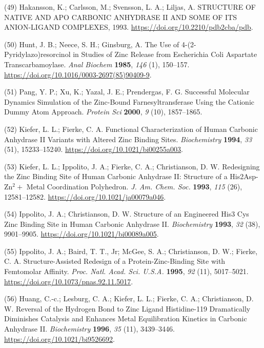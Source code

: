 \documentclass[ lineno,
  9pt]{elife}
\newenvironment{cslreferences}%
  {}%
  {\par}
\begin{document}
\begin{cslreferences}
\leavevmode\hypertarget{ref-jyFnBdWm}{}%
(49) Hakansson, K.; Carlsson, M.; Svensson, L. A.; Liljas, A. STRUCTURE OF NATIVE AND APO CARBONIC ANHYDRASE II AND SOME OF ITS ANION-LIGAND COMPLEXES, 1993. \url{https://doi.org/10.2210/pdb2cba/pdb}.

\leavevmode\hypertarget{ref-13XuOF3Jj}{}%
(50) Hunt, J. B.; Neece, S. H.; Ginsburg, A. The Use of 4-(2-Pyridylazo)resorcinol in Studies of Zinc Release from Escherichia Coli Aspartate Transcarbamoylase. \emph{Anal Biochem} \textbf{1985}, \emph{146} (1), 150--157. \url{https://doi.org/10.1016/0003-2697(85)90409-9}.

\leavevmode\hypertarget{ref-pchdLF0k}{}%
(51) Pang, Y. P.; Xu, K.; Yazal, J. E.; Prendergas, F. G. Successful Molecular Dynamics Simulation of the Zinc-Bound Farnesyltransferase Using the Cationic Dummy Atom Approach. \emph{Protein Sci} \textbf{2000}, \emph{9} (10), 1857--1865.

\leavevmode\hypertarget{ref-D3VQQdjb}{}%
(52) Kiefer, L. L.; Fierke, C. A. Functional Characterization of Human Carbonic Anhydrase II Variants with Altered Zinc Binding Sites. \emph{Biochemistry} \textbf{1994}, \emph{33} (51), 15233--15240. \url{https://doi.org/10.1021/bi00255a003}.

\leavevmode\hypertarget{ref-w3tzhp92}{}%
(53) Kiefer, L. L.; Ippolito, J. A.; Fierke, C. A.; Christianson, D. W. Redesigning the Zinc Binding Site of Human Carbonic Anhydrase II: Structure of a His2Asp-Zn$^2+$ Metal Coordination Polyhedron. \emph{J. Am. Chem. Soc.} \textbf{1993}, \emph{115} (26), 12581--12582. \url{https://doi.org/10.1021/ja00079a046}.

\leavevmode\hypertarget{ref-iu33cNMg}{}%
(54) Ippolito, J. A.; Christianson, D. W. Structure of an Engineered His3 Cys Zinc Binding Site in Human Carbonic Anhydrase II. \emph{Biochemistry} \textbf{1993}, \emph{32} (38), 9901--9905. \url{https://doi.org/10.1021/bi00089a005}.

\leavevmode\hypertarget{ref-148Si7kTL}{}%
(55) Ippolito, J. A.; Baird, T. T., Jr; McGee, S. A.; Christianson, D. W.; Fierke, C. A. Structure-Assisted Redesign of a Protein-Zinc-Binding Site with Femtomolar Affinity. \emph{Proc. Natl. Acad. Sci. U.S.A.} \textbf{1995}, \emph{92} (11), 5017--5021. \url{https://doi.org/10.1073/pnas.92.11.5017}.

\leavevmode\hypertarget{ref-TNbPH3Y1}{}%
(56) Huang, C.-c.; Lesburg, C. A.; Kiefer, L. L.; Fierke, C. A.; Christianson, D. W. Reversal of the Hydrogen Bond to Zinc Ligand Histidine-119 Dramatically Diminishes Catalysis and Enhances Metal Equilibration Kinetics in Carbonic Anhydrase II. \emph{Biochemistry} \textbf{1996}, \emph{35} (11), 3439--3446. \url{https://doi.org/10.1021/bi9526692}.


\end{cslreferences}
\end{document}
